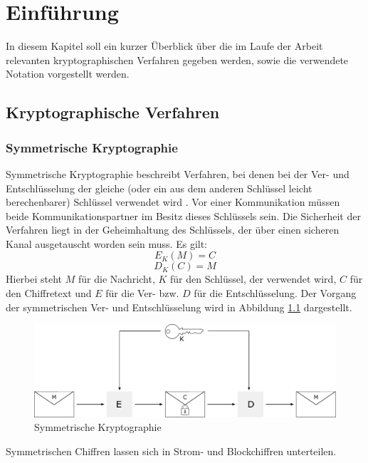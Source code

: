 \chapter{Einführung}

\label{cha_cryptographic_techniques}

In diesem Kapitel soll ein kurzer Überblick über die im Laufe der Arbeit relevanten kryptographischen Verfahren gegeben werden, sowie die verwendete Notation vorgestellt werden.

\section{Kryptographische Verfahren}

\subsection{Symmetrische Kryptographie}

Symmetrische Kryptographie beschreibt Verfahren, bei denen bei der Ver- und Entschlüsselung der gleiche (oder ein aus dem anderen Schlüssel leicht berechenbarer) Schlüssel verwendet wird \cite{Schneier2006}. Vor einer Kommunikation müssen beide Kommunikationspartner im Besitz dieses Schlüssels sein. Die Sicherheit der Verfahren liegt in der Geheimhaltung des Schlüssels,  der über einen sicheren Kanal ausgetauscht worden sein muss.
Es gilt:
\[E_K(M)=C\] 
\[D_K(C)=M\] 
Hierbei steht \(M\) für die Nachricht, \(K\) für den Schlüssel, der verwendet wird, \(C\) für den Chiffretext und \(E\) für die Ver- bzw. \(D\) für die  Entschlüsselung. Der Vorgang der symmetrischen Ver- und Entschlüsselung wird in Abbildung \ref{fig_symmetric_encryption} dargestellt.

\begin{figure}
	\centering
	\includegraphics[width=15cm]{Diagrams/SymmetricEncryption.pdf} %
	\caption{Symmetrische Kryptographie}
	\label{fig_symmetric_encryption}
\end{figure}

Symmetrischen Chiffren lassen sich in Strom- und Blockchiffren unterteilen.

